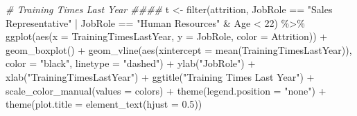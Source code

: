 \documentclass[
]{article}
\newenvironment{Shaded}{\begin{snugshade}}{\end{snugshade}}
\newcommand{\AttributeTok}[1]{\textcolor[rgb]{0.77,0.63,0.00}{#1}}
\newcommand{\CommentTok}[1]{\textcolor[rgb]{0.56,0.35,0.01}{\textit{#1}}}
\newcommand{\DecValTok}[1]{\textcolor[rgb]{0.00,0.00,0.81}{#1}}
\newcommand{\FloatTok}[1]{\textcolor[rgb]{0.00,0.00,0.81}{#1}}
\newcommand{\FunctionTok}[1]{\textcolor[rgb]{0.00,0.00,0.00}{#1}}
\newcommand{\NormalTok}[1]{#1}
\newcommand{\OtherTok}[1]{\textcolor[rgb]{0.56,0.35,0.01}{#1}}
\newcommand{\SpecialCharTok}[1]{\textcolor[rgb]{0.00,0.00,0.00}{#1}}
\newcommand{\StringTok}[1]{\textcolor[rgb]{0.31,0.60,0.02}{#1}}
\begin{document}
\begin{Shaded}
\begin{Highlighting}[]
\CommentTok{\# Training Times Last Year \#\#\#\#}
\NormalTok{t }\OtherTok{\textless{}{-}} \FunctionTok{filter}\NormalTok{(attrition, JobRole }\SpecialCharTok{==} \StringTok{"Sales Representative"} \SpecialCharTok{|}\NormalTok{ JobRole }\SpecialCharTok{==} \StringTok{"Human Resources"} \SpecialCharTok{\&}\NormalTok{ Age }\SpecialCharTok{\textless{}} \DecValTok{22}\NormalTok{) }\SpecialCharTok{\%\textgreater{}\%}
  \FunctionTok{ggplot}\NormalTok{(}\FunctionTok{aes}\NormalTok{(}\AttributeTok{x =}\NormalTok{ TrainingTimesLastYear, }\AttributeTok{y =}\NormalTok{ JobRole, }\AttributeTok{color =}\NormalTok{ Attrition)) }\SpecialCharTok{+}
  \FunctionTok{geom\_boxplot}\NormalTok{() }\SpecialCharTok{+}
  \FunctionTok{geom\_vline}\NormalTok{(}\FunctionTok{aes}\NormalTok{(}\AttributeTok{xintercept =} \FunctionTok{mean}\NormalTok{(TrainingTimesLastYear)), }\AttributeTok{color =} \StringTok{"black"}\NormalTok{, }\AttributeTok{linetype =} \StringTok{"dashed"}\NormalTok{) }\SpecialCharTok{+}
  \FunctionTok{ylab}\NormalTok{(}\StringTok{"JobRole"}\NormalTok{) }\SpecialCharTok{+}
  \FunctionTok{xlab}\NormalTok{(}\StringTok{"TrainingTimesLastYear"}\NormalTok{) }\SpecialCharTok{+}
  \FunctionTok{ggtitle}\NormalTok{(}\StringTok{"Training Times Last Year"}\NormalTok{) }\SpecialCharTok{+}
  \FunctionTok{scale\_color\_manual}\NormalTok{(}\AttributeTok{values =}\NormalTok{ colors) }\SpecialCharTok{+}
  \FunctionTok{theme}\NormalTok{(}\AttributeTok{legend.position =} \StringTok{"none"}\NormalTok{) }\SpecialCharTok{+}
  \FunctionTok{theme}\NormalTok{(}\AttributeTok{plot.title =} \FunctionTok{element\_text}\NormalTok{(}\AttributeTok{hjust =} \FloatTok{0.5}\NormalTok{)) }



\end{Highlighting}
\end{Shaded}
\end{document}
